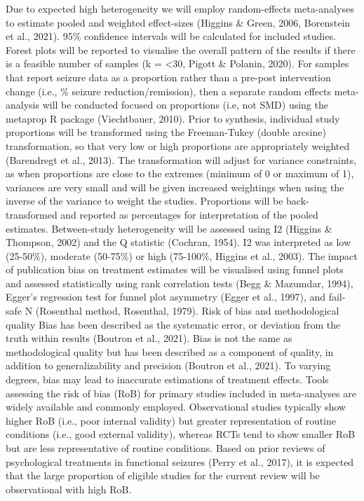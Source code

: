 \documentclass[
  12pt,
  openany]{book}
\begin{document}
Due to expected high heterogeneity we will employ random-effects meta-analyses to estimate pooled and weighted effect-sizes (Higgins \& Green, 2006, Borenstein et al., 2021). 95\% confidence intervals will be calculated for included studies. Forest plots will be reported to visualise the overall pattern of the results if there is a feasible number of samples (k = \textless30, Pigott \& Polanin, 2020).
For samples that report seizure data as a proportion rather than a pre-post intervention change (i.e., \% seizure reduction/remission), then a separate random effects meta-analysis will be conducted focused on proportions (i.e, not SMD) using the metaprop R package (Viechtbauer, 2010). Prior to synthesis, individual study proportions will be transformed using the Freeman-Tukey (double arcsine) transformation, so that very low or high proportions are appropriately weighted (Barendregt et al., 2013). The transformation will adjust for variance constraints, as when proportions are close to the extremes (minimum of 0 or maximum of 1), variances are very small and will be given increased weightings when using the inverse of the variance to weight the studies. Proportions will be back-transformed and reported as percentages for interpretation of the pooled estimates.
Between-study heterogeneity will be assessed using I2 (Higgins \& Thompson, 2002) and the Q statistic (Cochran, 1954). I2 was interpreted as low (25-50\%), moderate (50-75\%) or high (75-100\%, Higgins et al., 2003). The impact of publication bias on treatment estimates will be visualised using funnel plots and assessed statistically using rank correlation tests (Begg \& Mazumdar, 1994), Egger's regression test for funnel plot asymmetry (Egger et al., 1997), and fail-safe N (Rosenthal method, Rosenthal, 1979).
Risk of bias and methodological quality
Bias has been described as the systematic error, or deviation from the truth within results (Boutron et al., 2021). Bias is not the same as methodological quality but has been described as a component of quality, in addition to generalizability and precision (Boutron et al., 2021). To varying degrees, bias may lead to inaccurate estimations of treatment effects. Tools assessing the risk of bias (RoB) for primary studies included in meta-analyses are widely available and commonly employed. Observational studies typically show higher RoB (i.e., poor internal validity) but greater representation of routine conditions (i.e., good external validity), whereas RCTs tend to show smaller RoB but are less representative of routine conditions. Based on prior reviews of psychological treatments in functional seizures (Perry et al., 2017), it is expected that the large proportion of eligible studies for the current review will be observational with high RoB.
\end{document}
